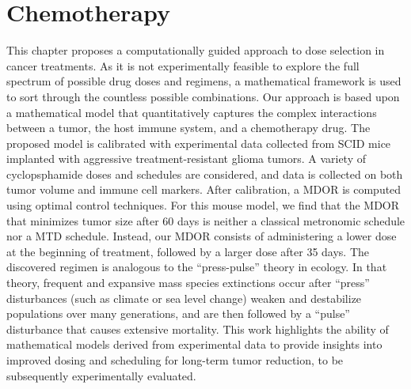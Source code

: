 \chapter{Chemotherapy}
\label{chap:chemo}

This chapter proposes a computationally guided approach to dose selection in cancer treatments.
As it is not experimentally feasible to explore the full spectrum of possible drug doses and regimens,
a mathematical framework is used to sort through the countless possible combinations.
Our approach is based upon a mathematical model that quantitatively captures the complex interactions between a tumor, the host immune system, and a chemotherapy drug.
The proposed model is calibrated with experimental data collected from \ac{SCID} mice implanted with aggressive treatment-resistant glioma tumors.  A variety of cyclopsphamide doses and schedules are considered, and data is collected on both tumor volume and immune cell markers.
After calibration, a \ac{MDOR} is computed using optimal control techniques.
For this mouse model, we find that the \ac{MDOR} that minimizes tumor size after 60 days is neither a classical metronomic schedule nor a \ac{MTD} schedule.
Instead, our \ac{MDOR} consists of administering a lower dose at the beginning of treatment, followed by a larger dose after 35 days.
The discovered regimen is analogous to the ``press-pulse'' theory in ecology.  In that theory, frequent and expansive mass species extinctions occur after ``press'' disturbances (such as climate or sea level change) weaken and destabilize populations over many generations, and are then followed by a ``pulse'' disturbance that causes extensive mortality.
This work highlights the ability of mathematical models derived from experimental data to provide insights into improved dosing and scheduling for long-term tumor reduction, to be subsequently experimentally evaluated.

